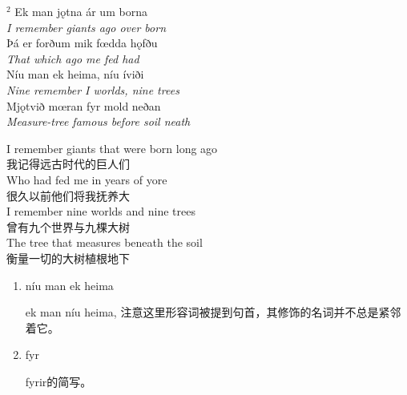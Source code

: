 \begin{paracol}{2}
    \noindent
    $^2 $ Ek man jǫtna ár um borna\\
    \textit{I remember giants ago over born}\\
    Þá er forðum mik fœdda hǫfðu\\
    \textit{That which ago me fed had}\\
    Níu man ek heima, níu íviði\\
    \textit{Nine remember I worlds, nine trees}\\
    Mjǫtvið mœran fyr mold neðan\\
    \textit{Measure-tree famous before soil neath}\\
    \switchcolumn

    \noindent
    I remember giants that were born long ago\\
    我记得远古时代的巨人们\\
    Who had fed me in years of yore\\
    很久以前他们将我抚养大\\
    I remember nine worlds and nine trees\\
    曾有九个世界与九棵大树\\
    The tree that measures beneath the soil\\
    衡量一切的大树植根地下\\

\end{paracol}

\begin{grammar*}{}
    \begin{enumerate}[leftmargin=*]
        \item níu man ek heima

              ek man níu heima, 注意这里形容词被提到句首，其修饰的名词并不总是紧邻着它。

        \item fyr

              fyrir的简写。
    \end{enumerate}
\end{grammar*}
\medskip %

